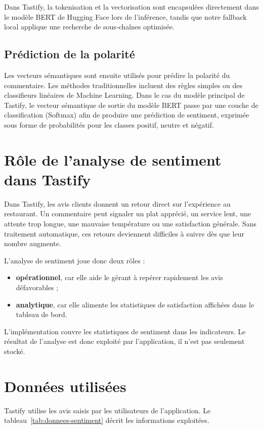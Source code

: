 Dans Tastify, la tokenisation et la vectorisation sont encapsulées directement dans le modèle BERT de Hugging Face lors de l'inférence, tandis que notre fallback local applique une recherche de sous-chaînes optimisée.

\subsection{Prédiction de la polarité}
Les vecteurs sémantiques sont ensuite utilisés pour prédire la polarité du commentaire. Les méthodes traditionnelles incluent des règles simples ou des classifieurs linéaires de Machine Learning. Dans le cas du modèle principal de Tastify, le vecteur sémantique de sortie du modèle BERT passe par une couche de classification (Softmax) afin de produire une prédiction de sentiment, exprimée sous forme de probabilités pour les classes positif, neutre et négatif.

\section{Rôle de l'analyse de sentiment dans Tastify}
Dans Tastify, les avis clients donnent un retour direct sur l'expérience au restaurant. Un commentaire peut signaler un plat apprécié, un service lent, une attente trop longue, une mauvaise température ou une satisfaction générale. Sans traitement automatique, ces retours deviennent difficiles à suivre dès que leur nombre augmente.

L'analyse de sentiment joue donc deux rôles :
\begin{itemize}
  \item \textbf{opérationnel}, car elle aide le gérant à repérer rapidement les avis défavorables ;
  \item \textbf{analytique}, car elle alimente les statistiques de satisfaction affichées dans le tableau de bord.
\end{itemize}

L'implémentation couvre les statistiques de sentiment dans les indicateurs. Le résultat de l'analyse est donc exploité par l'application, il n'est pas seulement stocké.

\section{Données utilisées}
Tastify utilise les avis saisis par les utilisateurs de l'application. Le tableau~\ref{tab:donnees-sentiment} décrit les informations exploitées.

